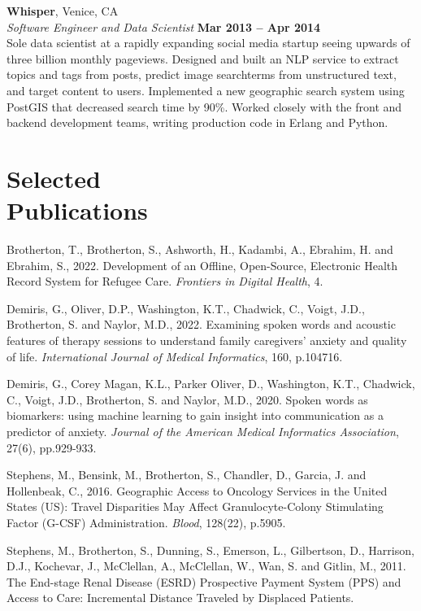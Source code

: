 \documentclass[margin,line]{resume}
\begin{document}
\begin{resume}
    \textbf{Whisper}, Venice, CA \vspace{2mm}\\\vspace{1mm}%
    \textsl{Software Engineer and Data Scientist} \hfill \textbf{Mar 2013 -- Apr 2014}\\
    Sole data scientist at a rapidly expanding social media startup
    seeing upwards of three billion monthly pageviews. Designed and built an NLP
    service to extract topics and tags from posts, predict image searchterms
    from unstructured text, and target content to users. Implemented a new
    geographic search system using PostGIS that decreased search time by
    90\%. Worked closely with the front and backend development teams, writing
    production code in Erlang and Python.

    \section{\mysidestyle Selected\\Publications}
    Brotherton, T., Brotherton, S., Ashworth, H., Kadambi, A., Ebrahim, H. and Ebrahim, S., 2022. Development of an Offline, Open-Source, Electronic Health Record System for Refugee Care. \emph{Frontiers in Digital Health}, 4.

    Demiris, G., Oliver, D.P., Washington, K.T., Chadwick, C., Voigt, J.D., Brotherton, S. and Naylor, M.D., 2022. Examining spoken words and acoustic features of therapy sessions to understand family caregivers’ anxiety and quality of life. \emph{International Journal of Medical Informatics}, 160, p.104716.

    Demiris, G., Corey Magan, K.L., Parker Oliver, D., Washington, K.T., Chadwick, C., Voigt, J.D., Brotherton, S. and Naylor, M.D., 2020. Spoken words as biomarkers: using machine learning to gain insight into communication as a predictor of anxiety. \emph{Journal of the American Medical Informatics Association}, 27(6), pp.929-933.

    Stephens, M., Bensink, M., Brotherton, S., Chandler, D., Garcia, J. and Hollenbeak, C., 2016. Geographic Access to Oncology Services in the United States (US): Travel Disparities May Affect Granulocyte-Colony Stimulating Factor (G-CSF) Administration. \emph{Blood}, 128(22), p.5905.

    Stephens, M., Brotherton, S., Dunning, S., Emerson, L., Gilbertson, D., Harrison, D.J., Kochevar, J., McClellan, A., McClellan, W., Wan, S. and Gitlin, M., 2011. The End-stage Renal Disease (ESRD) Prospective Payment System (PPS) and Access to Care: Incremental Distance Traveled by Displaced Patients.


\end{resume}
\end{document}
